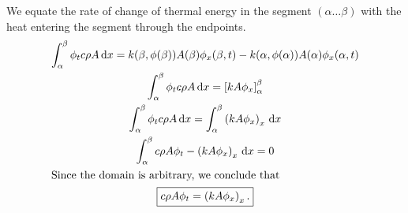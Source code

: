 {%
\begin{Solution}
  We equate the rate of change of thermal energy in the segment 
  $(\alpha \ldots \beta)$ with the heat entering the segment through
  the endpoints.
  \begin{gather*}
    \int_\alpha^\beta \phi_t c \rho A \,\mathrm{d} x 
    = k(\beta, \phi(\beta)) A(\beta) \phi_x(\beta, t)
    - k(\alpha, \phi(\alpha)) A(\alpha) \phi_x(\alpha, t) \\
    \int_\alpha^\beta \phi_t c \rho A \,\mathrm{d} x 
    = \left[ k A \phi_x \right]_\alpha^\beta \\
    \int_\alpha^\beta \phi_t c \rho A \,\mathrm{d} x 
    = \int_\alpha^\beta \left( k A \phi_x \right)_x \,\mathrm{d} x \\
    \int_\alpha^\beta c \rho A \phi_t - \left( k A \phi_x \right)_x \,\mathrm{d} x = 0 \\
    \intertext{Since the domain is arbitrary, we conclude that}
    \boxed{
      c \rho A \phi_t = \left( k A \phi_x \right)_x.
      }
  \end{gather*}
\end{Solution}









\raggedbottom
}
